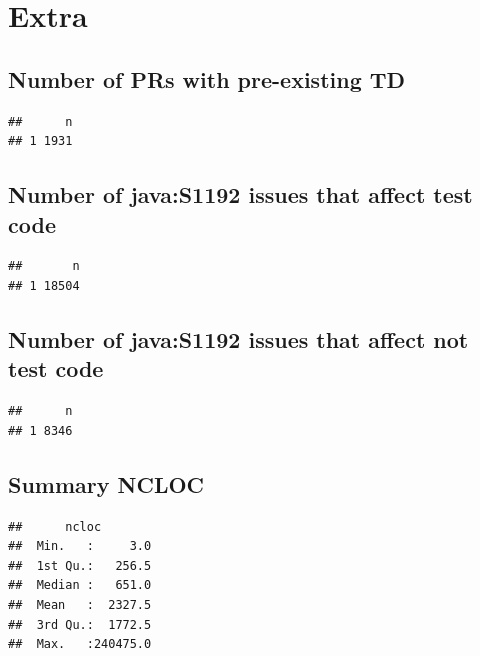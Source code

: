\documentclass[
]{article}
\begin{document}
\section{Extra}\label{extra}

\subsection{Number of PRs with pre-existing
TD}\label{number-of-prs-with-pre-existing-td}

\begin{verbatim}
##      n
## 1 1931
\end{verbatim}

\subsection{Number of java:S1192 issues that affect test
code}\label{number-of-javas1192-issues-that-affect-test-code}

\begin{verbatim}
##       n
## 1 18504
\end{verbatim}

\subsection{Number of java:S1192 issues that affect not test
code}\label{number-of-javas1192-issues-that-affect-not-test-code}

\begin{verbatim}
##      n
## 1 8346
\end{verbatim}

\subsection{Summary NCLOC}\label{summary-ncloc}

\begin{verbatim}
##      ncloc         
##  Min.   :     3.0  
##  1st Qu.:   256.5  
##  Median :   651.0  
##  Mean   :  2327.5  
##  3rd Qu.:  1772.5  
##  Max.   :240475.0
\end{verbatim}
\end{document}
